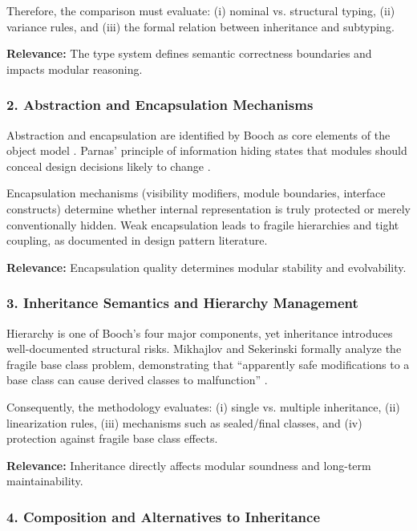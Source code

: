 Therefore, the comparison must evaluate: (i) nominal vs. structural typing, (ii) variance rules, and (iii) the formal relation between inheritance and subtyping.

\textbf{Relevance:} The type system defines semantic correctness boundaries and impacts modular reasoning.

\subsubsection{2. Abstraction and Encapsulation Mechanisms}

Abstraction and encapsulation are identified by Booch as core elements of the object model \cite{booch2008object}. Parnas’ principle of information hiding states that modules should conceal design decisions likely to change \cite{parnas1972criteria}. 

Encapsulation mechanisms (visibility modifiers, module boundaries, interface constructs) determine whether internal representation is truly protected or merely conventionally hidden. Weak encapsulation leads to fragile hierarchies and tight coupling, as documented in design pattern literature.

\textbf{Relevance:} Encapsulation quality determines modular stability and evolvability.

\subsubsection{3. Inheritance Semantics and Hierarchy Management}

Hierarchy is one of Booch’s four major components, yet inheritance introduces well-documented structural risks. Mikhajlov and Sekerinski formally analyze the fragile base class problem, demonstrating that “apparently safe modifications to a base class can cause derived classes to malfunction” \cite{mikhajlov1998study}. 

Consequently, the methodology evaluates: (i) single vs. multiple inheritance, (ii) linearization rules, (iii) mechanisms such as sealed/final classes, and (iv) protection against fragile base class effects.

\textbf{Relevance:} Inheritance directly affects modular soundness and long-term maintainability.

\subsubsection{4. Composition and Alternatives to Inheritance}

